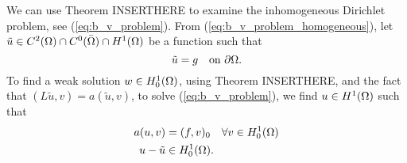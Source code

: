 


We can use Theorem INSERTHERE to examine the inhomogeneous Dirichlet problem, 
see (\ref{eq:b_v_problem}). From (\ref{eq:b_v_problem_homogeneous}), let 
$\tilde{u} \in C^2(\Omega)\cap C^0(\bar{\Omega}) \cap H^1(\Omega)$ be a function such that 
\begin{equation*}
   \tilde{u} = g \quad \text{on } \partial \Omega.
\end{equation*}
To find a weak solution $w \in H_0^1(\Omega)$, using Theorem INSERTHERE, and the 
fact that $(L\tilde{u},v) = a(\tilde{u},v)$, to solve (\ref{eq:b_v_problem}), 
we find $u \in H^1(\Omega)$ such that 
\begin{align*}
   a(u,v) &= (f,v)_0 \quad \forall v \in H_0^1(\Omega) \\
   u-\tilde{u} & \in H_0^1(\Omega).
\end{align*}